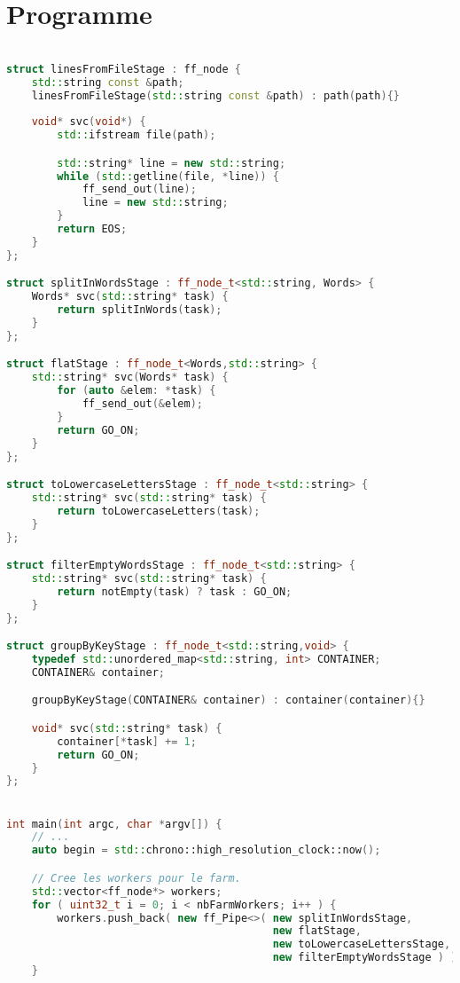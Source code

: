 \section{Programme }
\begin{lstlisting}[basicstyle=\ttfamily\footnotesize,language=c++]

struct linesFromFileStage : ff_node {
    std::string const &path;
    linesFromFileStage(std::string const &path) : path(path){}
    
    void* svc(void*) {
        std::ifstream file(path);

        std::string* line = new std::string;
        while (std::getline(file, *line)) {
            ff_send_out(line);
            line = new std::string;
        }
        return EOS;
    }
};

struct splitInWordsStage : ff_node_t<std::string, Words> {
    Words* svc(std::string* task) {
        return splitInWords(task);
    }
};

struct flatStage : ff_node_t<Words,std::string> {
    std::string* svc(Words* task) {
        for (auto &elem: *task) {
            ff_send_out(&elem);
        }
        return GO_ON;
    }
};

struct toLowercaseLettersStage : ff_node_t<std::string> {
    std::string* svc(std::string* task) {
        return toLowercaseLetters(task);
    }
};

struct filterEmptyWordsStage : ff_node_t<std::string> {
    std::string* svc(std::string* task) {
        return notEmpty(task) ? task : GO_ON;
    }
};

struct groupByKeyStage : ff_node_t<std::string,void> {
    typedef std::unordered_map<std::string, int> CONTAINER;
    CONTAINER& container;

    groupByKeyStage(CONTAINER& container) : container(container){}

    void* svc(std::string* task) {
        container[*task] += 1;
        return GO_ON;
    }
};


int main(int argc, char *argv[]) {
    // ...
    auto begin = std::chrono::high_resolution_clock::now();

    // Cree les workers pour le farm.
    std::vector<ff_node*> workers;
    for ( uint32_t i = 0; i < nbFarmWorkers; i++ ) {
        workers.push_back( new ff_Pipe<>( new splitInWordsStage,
                                          new flatStage,
                                          new toLowercaseLettersStage,
                                          new filterEmptyWordsStage ) );
    }


\end{lstlisting}
